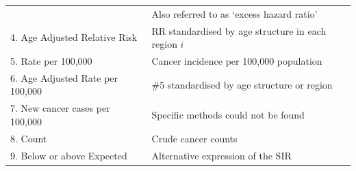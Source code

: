 \documentclass[11pt,]{article}
\begin{document}
\begin{longtable}[]{@{}ll@{}}
\begin{minipage}[t]{0.28\columnwidth}
\strut
\end{minipage} & \begin{minipage}[t]{0.66\columnwidth}\raggedright
Also referred to as `excess hazard ratio'\strut
\end{minipage}\tabularnewline
\begin{minipage}[t]{0.28\columnwidth}\raggedright
4. Age Adjusted Relative Risk\strut
\end{minipage} & \begin{minipage}[t]{0.66\columnwidth}\raggedright
RR standardised by age structure in each region \(i\)\strut
\end{minipage}\tabularnewline
\begin{minipage}[t]{0.28\columnwidth}\raggedright
5. Rate per 100,000\strut
\end{minipage} & \begin{minipage}[t]{0.66\columnwidth}\raggedright
Cancer incidence per 100,000 population\strut
\end{minipage}\tabularnewline
\begin{minipage}[t]{0.28\columnwidth}\raggedright
6. Age Adjusted Rate per 100,000\strut
\end{minipage} & \begin{minipage}[t]{0.66\columnwidth}\raggedright
\#5 standardised by age structure or region\strut
\end{minipage}\tabularnewline
\begin{minipage}[t]{0.28\columnwidth}\raggedright
7. New cancer cases per 100,000\strut
\end{minipage} & \begin{minipage}[t]{0.66\columnwidth}\raggedright
Specific methods could not be found\strut
\end{minipage}\tabularnewline
\begin{minipage}[t]{0.28\columnwidth}\raggedright
8. Count\strut
\end{minipage} & \begin{minipage}[t]{0.66\columnwidth}\raggedright
Crude cancer counts\strut
\end{minipage}\tabularnewline
\begin{minipage}[t]{0.28\columnwidth}\raggedright
9. Below or above Expected\strut
\end{minipage} & \begin{minipage}[t]{0.66\columnwidth}\raggedright
Alternative expression of the SIR\strut
\end{minipage}\tabularnewline
\bottomrule
\end{longtable}
\end{document}
